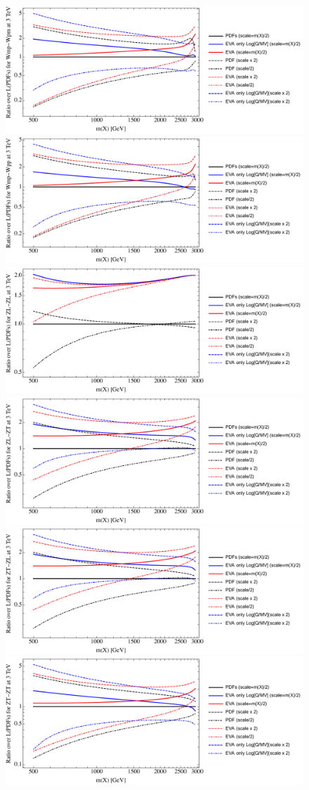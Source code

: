 \documentclass[a4paper,11pt]{article}
\begin{document}
\begin{figure}[ht]
\includegraphics[width=0.46\linewidth]{Notebooks/PlotLumi/3TeV/ratios/Wmp-Wpm.pdf}
\includegraphics[width=0.46\linewidth]{Notebooks/PlotLumi/3TeV/ratios/Wmp-Wpp.pdf}
\includegraphics[width=0.46\linewidth]{Notebooks/PlotLumi/3TeV/ratios/ZL-ZL.pdf}
\includegraphics[width=0.46\linewidth]{Notebooks/PlotLumi/3TeV/ratios/ZL-ZT.pdf}
\includegraphics[width=0.46\linewidth]{Notebooks/PlotLumi/3TeV/ratios/ZT-ZL.pdf}
\includegraphics[width=0.46\linewidth]{Notebooks/PlotLumi/3TeV/ratios/ZT-ZT.pdf}
\end{figure}
\end{document}
